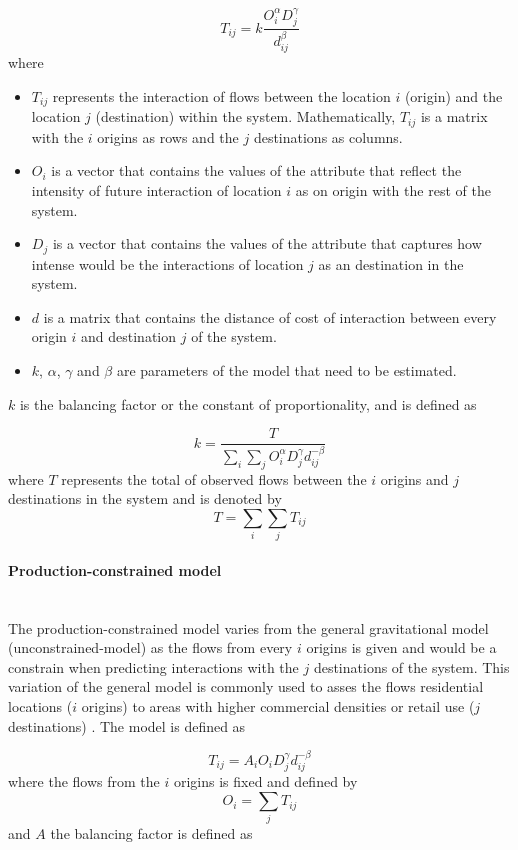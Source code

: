 \documentclass{article}
\begin{document}
\[T_{ij} = k \frac{O_i^\alpha  D_j^\gamma}{ d_{ij}^\beta}\] where 

\begin{itemize}
  \item $T_{ij}$ represents the interaction of flows between the location $i$ (origin) and the location $j$ (destination) within the system. Mathematically,  $T_{ij}$ is a matrix with the $i$ origins as rows and the $j$ destinations as columns.
  \item $O_{i}$ is a vector that contains the values of the attribute that reflect the intensity of future interaction of location $i$ as on origin with the rest of the system.
  \item $D_{j}$ is a vector that contains the values of the attribute that captures how intense would be the interactions of location $j$ as an destination in the system.
    \item $d$ is a matrix that contains the distance of cost of interaction between every origin $i$ and destination $j$ of the system.
    \item $k$, $\alpha$, $\gamma$ and $\beta$ are parameters of the model that need to be estimated.
\end{itemize}

$k$ is the balancing factor or the constant of proportionality, and is defined as

\[k = \frac{T}{\sum_i \sum_j O_i^\alpha  D_j^\gamma  d_{ij}^{-\beta}}\] where $T$ represents the total of observed flows between the $i$ origins and $j$ destinations in the system and is denoted by \[T= \sum_i \sum_j T_{ij}\]
\paragraph{Production-constrained model}\mbox{}\\

The production-constrained model varies from the general gravitational model (unconstrained-model) as the flows from every $i$ origins is given and would be a constrain when predicting interactions with the $j$ destinations of the system. This variation of the general model is commonly used to asses the flows residential locations ($i$ origins) to areas with higher commercial densities or retail use ($j$ destinations) \citep{wilkinsonSpatialInteractionModelling2023}. The model is defined as

\[T_{ij} = A_i O_i D_j^\gamma d_{ij}^{-\beta}\] where the flows from the $i$ origins is fixed and defined by \[O_i = \sum_j T_{ij}\] and $A$ the balancing factor is defined as
\end{document}
